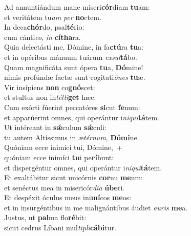 \evenverse Ad annuntiándum mane miseri\textbf{cór}diam \textbf{tu}am:~\*\\
\evenverse et veritátem tu\textit{am} \textit{per} \textbf{no}ctem.\\
\oddverse In deca\textbf{chór}do, psal\textbf{té}rio:~\*\\
\oddverse cum cánti\textit{co}, \textit{in} \textbf{cí}\textbf{tha}ra.\\
\evenverse Quia delectásti me, Dómine, in fa\textbf{ctú}ra \textbf{tu}a:~\*\\
\evenverse et in opéribus mánuum tuárum \textit{ex}\textit{sul}\textbf{tá}bo.\\
\oddverse Quam magnificáta sunt ópera \textbf{tu}a, \textbf{Dó}mine!~\*\\
\oddverse nimis profúndæ factæ sunt cogitati\textit{ó}\textit{nes} \textbf{tu}æ.\\
\evenverse Vir insípiens \textbf{non} co\textbf{gnó}scet:~\*\\
\evenverse et stultus non in\textit{tél}\textit{li}\textbf{get} hæc.\\
\oddverse Cum exórti fúerint peccatóres \textbf{si}cut \textbf{fe}num:~\*\\
\oddverse et apparúerint omnes, qui operántur i\textit{ni}\textit{qui}\textbf{tá}tem.\\
\evenverse Ut intéreant in \textbf{sǽ}culum \textbf{sǽ}culi:~\*\\
\evenverse tu autem Altíssimus in æ\textit{tér}\textit{num}, \textbf{Dó}\textbf{mi}ne.\\
\oddverse Quóniam ecce inimíci tui, Dómine,~+\\
\oddverse  quóniam ecce inimíci \textbf{tu}i pe\textbf{rí}bunt:~\*\\
\oddverse et dispergéntur omnes, qui operántur i\textit{ni}\textit{qui}\textbf{tá}tem.\\
\evenverse Et exaltábitur sicut unicórnis \textbf{cor}nu \textbf{me}um:~\*\\
\evenverse et senéctus mea in misericór\textit{di}\textit{a} \textbf{ú}\textbf{be}ri.\\
\oddverse Et despéxit óculus meus ini\textbf{mí}cos \textbf{me}os:~\*\\
\oddverse et in insurgéntibus in me malignántibus áudiet \textit{au}\textit{ris} \textbf{me}a.\\
\evenverse Justus, ut \textbf{pal}ma flo\textbf{ré}bit:~\*\\
\evenverse sicut cedrus Líbani mul\textit{ti}\textit{pli}\textbf{cá}\textbf{bi}tur.\\
